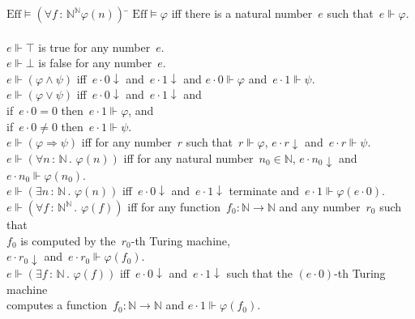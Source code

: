 \documentclass[oneside]{amsart}
\theoremstyle{definition}
\theoremstyle{plain}
\theoremstyle{remark}
\newcommand{\NN}{\mathbb{N}}
\newcommand{\Eff}{\mathrm{Ef{}f}}
\renewcommand{\_}{\mathpunct{.}\,}
\newcommand{\effective}{ef{}fective\xspace}
\newcommand{\?}{\,{:}\,}
\newcommand{\realizes}{\Vdash}
\begin{document}
\begin{table}
  \begin{tabbing}
    $\Eff \models (\forall f\?\NN^\NN \varphi(n))\!\!$ \= \kill
    $\Eff \models \varphi$ \> iff there is a natural number~$e$ such that~$e
    \realizes \varphi$. \\\\
    $e \realizes \top$ \> is true for any number~$e$. \\
    $e \realizes \bot$ \> is false for any number~$e$. \\
    $e \realizes (\varphi \wedge \psi)$ \> iff~$e \cdot 0 \downarrow$ and~$e
    \cdot 1 \downarrow$ and $e\cdot0 \realizes \varphi$ and~$e\cdot1 \realizes \psi$. \\
    $e \realizes (\varphi \vee \psi)$ \> iff~$e \cdot 0 \downarrow$ and~$e
    \cdot 1 \downarrow$ and \\ \> \qquad if~$e\cdot0 = 0$ then~$e\cdot1 \realizes
    \varphi$, and \\ \> \qquad if~$e\cdot0 \neq 0$ then~$e\cdot1 \realizes \psi$. \\
    $e \realizes (\varphi \Rightarrow \psi)$ \> iff for any number~$r$
    such that~$r \realizes \varphi$, $e \cdot r \downarrow$ and~$e \cdot r \realizes \psi$. \\
    $e \realizes (\forall n\?\NN\_ \varphi(n))$ \> iff for any natural number~$n_0
    \in \NN$, $e \cdot n_0 \downarrow$ and~$e \cdot n_0 \realizes \varphi(n_0)$. \\
    $e \realizes (\exists n\?\NN\_ \varphi(n))$ \> iff~$e\cdot0 \downarrow$ and~$e\cdot1 \downarrow$
    terminate and~$e\cdot1 \realizes \varphi(e\cdot0)$. \\
    $e \realizes (\forall f\?\NN^\NN\_ \varphi(f))$ \> iff for any function~$f_0
    : \NN \to \NN$ and any number~$r_0$ such that \\ \> \qquad $f_0$ is computed by the~$r_0$-th
    Turing machine, \\ \> \qquad
    $e \cdot r_0 \downarrow$ and~$e \cdot r_0 \realizes \varphi(f_0)$. \\
    $e \realizes (\exists f\?\NN\_ \varphi(f))$ \> iff~$e \cdot 0 \downarrow$
    and~$e \cdot 1 \downarrow$ such that
    the $(e \cdot 0)$-th Turing machine \\ \> \qquad computes a function~$f_0 : \NN \to \NN$
    and $e \cdot 1 \realizes \varphi(f_0)$.
  \end{tabbing}

  \caption{\label{table:eff} A (fragment of) the translation
  rules defining the meaning of statements internal to the \effective topos.
  We write~``$e \cdot n \downarrow$'' to mean that calling the~$e$-th Turing
  machine on input~$n$ terminates, and in this case denote the result by~``$e
  \cdot n$''.}
\end{table}

\printbibliography
\end{document}
